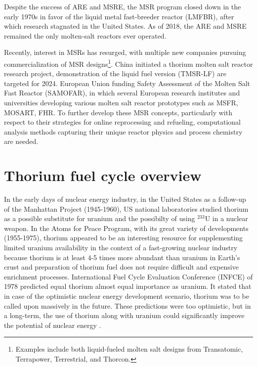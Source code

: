 Despite the success of \gls{ARE} and \gls{MSRE}, the \gls{MSR} program closed down in the early 1970s in favor of the liquid metal fast-breeder reactor (LMFBR),\cite{macpherson_molten_1985} after which research stagnated in the United States. As of 2018, the \gls{ARE} and \gls{MSRE} remained the only molten-salt reactors ever operated.

Recently, interest in \glspl{MSR} has resurged, with multiple new companies pursuing commercialization of \gls{MSR} designs\footnote{Examples include both liquid-fueled molten salt designs from Transatomic, Terrapower, Terrestrial, and Thorcon.}. China initiated a thorium molten salt reactor research project, demonstration of the liquid fuel version (TMSR-LF) are targeted for 2024. European Union funding Safety Assessment of the Molten Salt Fast Reactor (SAMOFAR), in which several European research institutes and universities developing various molten salt reactor prototypes such as \gls{MSFR}, \gls{MOSART}, \gls{FHR}.
To further develop these \gls{MSR} concepts, particularly with respect to their strategies for online reprocessing and refueling, computational analysis methods capturing their unique reactor physics and process chemistry are needed.

\section{Thorium fuel cycle overview}
In the early days of nuclear energy industry, in the United States as a follow-up of the Manhattan Project (1945-1960), US national laboratories studied thorium as a possible substitute for uranium and the possibilty of using $^{233}$U in a nuclear weapon. In the Atoms for Peace Program, with its great variety of developments (1955-1975), thorium appeared to be an interesting resource for supplementing limited uranium availability in the context of a fast-growing nuclear industry because thorium is  at least 4-5 times more abundant than uranium in Earth’s crust and preparation of thorium fuel does not require difficult and expensive enrichment processes. International Fuel Cycle Evaluation Conference (INFCE) of 1978 predicted equal thorium almost equal importance as uranium. It stated that in case of the optimistic nuclear energy development scenario, thorium was to be called upon massively in the future. These predictions were too optimistic, but in a long-term, the use of thorium along with uranium could significantly improve the potential of nuclear energy \cite{lung_perspectives_1998}.


